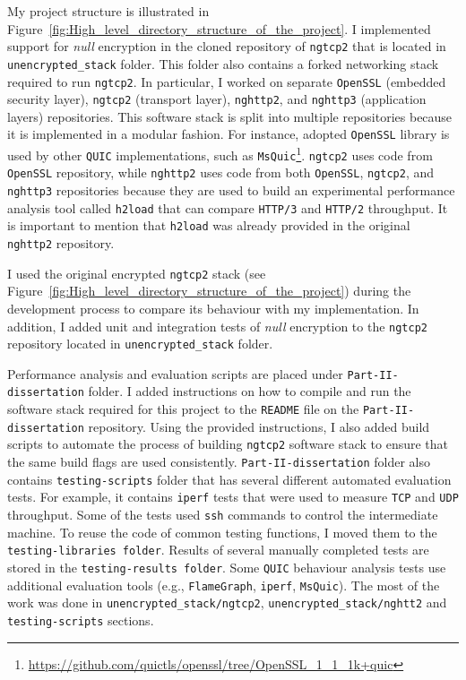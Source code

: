 \documentclass[12pt,a4paper,twoside,openright]{report}
\begin{document}
My project structure is illustrated in Figure~\ref{fig:High_level_directory_structure_of_the_project}.
I implemented support for \textit{null} encryption in the cloned repository of \texttt{ngtcp2} that is located in \texttt{unencrypted\_stack} folder.
This folder also contains a forked networking stack required to run \texttt{ngtcp2}. 
In particular, I worked on separate \texttt{OpenSSL} (embedded security layer), \texttt{ngtcp2} (transport layer), \texttt{nghttp2}, and \texttt{nghttp3} (application layers) repositories.
This software stack is split into multiple repositories because it is implemented in a modular fashion.
For instance, adopted \texttt{OpenSSL} library is used by other \texttt{QUIC} implementations, such as \texttt{MsQuic}\footnote{\url{https://github.com/quictls/openssl/tree/OpenSSL_1_1_1k+quic}}.
\texttt{ngtcp2} uses code from \texttt{OpenSSL} repository, while \texttt{nghttp2} uses code from both \texttt{OpenSSL},  \texttt{ngtcp2}, and  \texttt{nghttp3} repositories because they are used to build an experimental performance analysis tool called \texttt{h2load} that can compare \texttt{HTTP/3} and \texttt{HTTP/2} throughput.
It is important to mention that \texttt{h2load} was already provided in the original \texttt{nghttp2} repository.


I used the original encrypted \texttt{ngtcp2} stack (see Figure~\ref{fig:High_level_directory_structure_of_the_project}) during the development process to compare its behaviour with my implementation.
In addition, I added unit and integration tests of \textit{null} encryption to the \texttt{ngtcp2} repository located in \texttt{unencrypted\_stack} folder. 






Performance analysis and evaluation scripts are placed under \texttt{Part-II-dissertation} folder.
I added instructions on how to compile and run the software stack required for this project to the \texttt{README} file on the \texttt{Part-II-dissertation} repository.
Using the provided instructions, I also added build scripts to automate the process of building \texttt{ngtcp2} software stack to ensure that the same build flags are used consistently.
\texttt{Part-II-dissertation} folder also contains \texttt{testing-scripts} folder that has several different automated evaluation tests.
For example, it contains \texttt{iperf} tests that were used to measure \texttt{TCP} and \texttt{UDP} throughput.
Some of the tests used \texttt{ssh} commands to control the intermediate machine.
To reuse the code of common testing functions, I moved them to the \texttt{testing-libraries folder}.
Results of several manually completed tests are stored in the \texttt{testing-results folder}.
Some \texttt{QUIC} behaviour analysis tests use additional evaluation tools (e.g., \texttt{FlameGraph}, \texttt{iperf}, \texttt{MsQuic}).
The most of the work was done in \texttt{unencrypted\_stack/ngtcp2}, \texttt{unencrypted\_stack/nghtt2} and \texttt{testing-scripts} sections.
\end{document}

